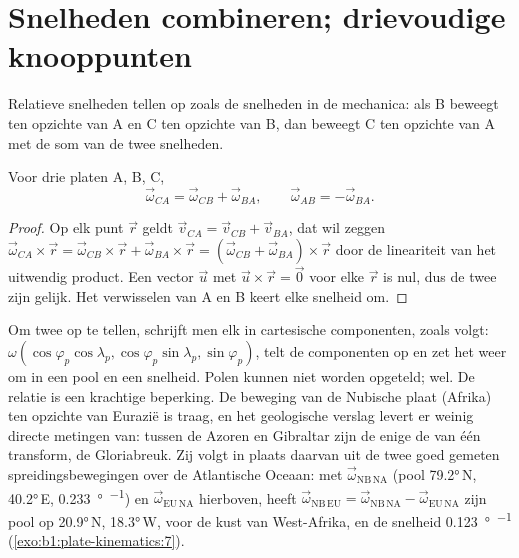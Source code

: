 \section{Snelheden combineren; drievoudige knooppunten}

Relatieve snelheden tellen op zoals de snelheden in de mechanica: als B beweegt ten opzichte van A en C ten opzichte van B, dan beweegt C ten opzichte van A met de som van de twee snelheden.

\begin{proposition}\label{prop:b1:plate-kinematics:addition}
Voor drie platen A, B, C,
\[
  \vec\omega_{CA} = \vec\omega_{CB} + \vec\omega_{BA}, \qquad
  \vec\omega_{AB} = -\vec\omega_{BA}.
\]
\end{proposition}

\begin{proof}
Op elk punt $\vec r$ geldt $\vec v_{CA} = \vec v_{CB} + \vec v_{BA}$, dat wil zeggen
$\vec\omega_{CA}\times\vec r = \vec\omega_{CB}\times\vec r +
\vec\omega_{BA}\times\vec r = (\vec\omega_{CB} + \vec\omega_{BA})\times\vec r$
door de lineariteit van het uitwendig product. Een vector $\vec u$ met
$\vec u\times\vec r = \vec 0$ voor elke $\vec r$ is nul, dus de twee  zijn gelijk. Het verwisselen van A en B keert elke snelheid om.
\end{proof}

Om twee  op te tellen, schrijft men elk in cartesische componenten, zoals volgt: $\omega(\cos\varphi_p
\cos\lambda_p, \cos\varphi_p\sin\lambda_p, \sin\varphi_p)$, telt de componenten op en zet het weer om in een pool en een snelheid. Polen kunnen niet worden opgeteld;  wel. De relatie is een krachtige beperking. De beweging van de Nubische plaat (Afrika) ten opzichte van Eurazië is traag, en het geologische verslag levert er weinig directe metingen van: tussen de Azoren en Gibraltar zijn de enige de  van één transform, de Gloriabreuk. Zij volgt in plaats daarvan uit de twee goed gemeten spreidingsbewegingen over de Atlantische Oceaan: met $\vec\omega_{\mathrm{NB\,NA}}$ (pool
\ang{79.2}\,N, \ang{40.2}\,E, \qty{0.233}{\degree\per\Myr}) en
$\vec\omega_{\mathrm{EU\,NA}}$ hierboven, heeft $\vec\omega_{\mathrm{NB\,EU}} =
\vec\omega_{\mathrm{NB\,NA}} - \vec\omega_{\mathrm{EU\,NA}}$ zijn pool op \ang{20.9}\,N, \ang{18.3}\,W, voor de kust van West-Afrika, en de snelheid \qty{0.123}{\degree\per\Myr} (\cref{exo:b1:plate-kinematics:7}).

